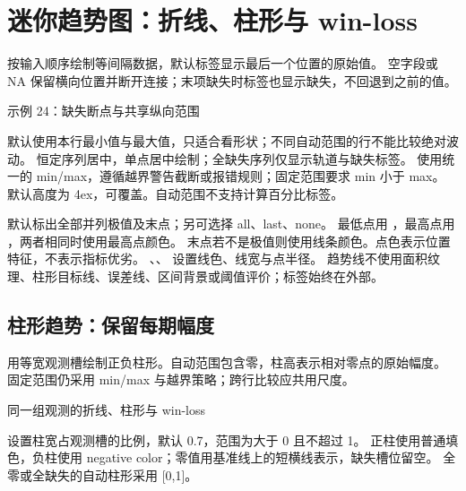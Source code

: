 \section{迷你趋势图：折线、柱形与 win-loss}
 按输入顺序绘制等间隔数据，默认标签显示最后一个位置的原始值。
空字段或 NA 保留横向位置并断开连接；末项缺失时标签也显示缺失，不回退到之前的值。
\begin{example}[text and listing,sidebyside=false]{示例 24：缺失断点与共享纵向范围}


\end{example}
 默认使用本行最小值与最大值，只适合看形状；不同自动范围的行不能比较绝对波动。
恒定序列居中，单点居中绘制；全缺失序列仅显示轨道与缺失标签。
 使用统一的 min/max，遵循越界警告截断或报错规则；固定范围要求 min 小于 max。
默认高度为 4ex，可覆盖。自动范围不支持计算百分比标签。

 默认标出全部并列极值及末点；另可选择 all、last、none。
最低点用 ，最高点用 ，两者相同时使用最高点颜色。
末点若不是极值则使用线条颜色。点色表示位置特征，不表示指标优劣。
、、 设置线色、线宽与点半径。
趋势线不使用面积纹理、柱形目标线、误差线、区间背景或阈值评价；标签始终在外部。

\subsection{柱形趋势：保留每期幅度}
 用等宽观测槽绘制正负柱形。自动范围包含零，柱高表示相对零点的原始幅度。
固定范围仍采用 min/max 与越界策略；跨行比较应共用尺度。
\begin{example}[text and listing,sidebyside=false]{同一组观测的折线、柱形与 win-loss}


\end{example}
 设置柱宽占观测槽的比例，默认 0.7，范围为大于 0 且不超过 1。
正柱使用普通填色，负柱使用 negative color；零值用基准线上的短横线表示，缺失槽位留空。
全零或全缺失的自动柱形采用 [0,1]。

